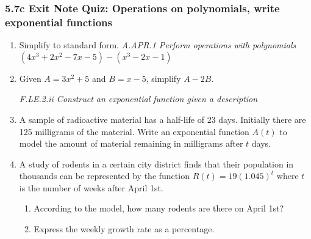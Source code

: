 \documentclass[12pt, twoside]{article}
\begin{document}
\subsubsection*{5.7c Exit Note Quiz: Operations on polynomials, write exponential functions}
\begin{enumerate}

\item Simplify to standard form. \hfill \emph{A.APR.1 Perform operations with polynomials} \\[0.25cm]
$(4x^3 + 2x^2 - 7x - 5) - (x^3 - 2x - 1)$ \vspace{4cm}

\item Given $A = 3x^2+5$ and $B = x-5$, simplify $A - 2B$. \vspace{5cm}


\; \hfill \emph{F.LE.2.ii Construct an exponential function given a description}
\item A sample of radioactive material has a half-life of 23 days. Initially there are 125 milligrams of the material. Write an exponential function $A(t)$ to model the amount of material remaining in milligrams after $t$ days. \vspace{2cm}

\item A study of rodents in a certain city district finds that their population in thousands can be represented by the function $R(t) = 19(1.045)^t$ where $t$ is the number of weeks after April 1st. 
\begin{enumerate}[itemsep=1.5cm]
    \item According to the model, how many rodents are there on April 1st?
    \item Express the weekly growth rate as a percentage.
\end{enumerate}  \vspace{2cm}

\end{enumerate}
\end{document}
